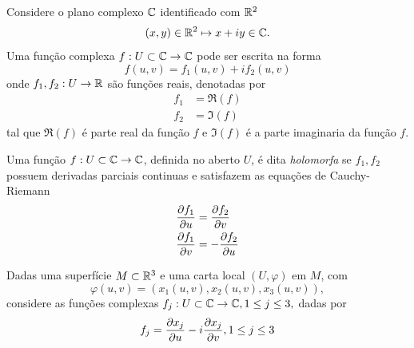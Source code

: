 Considere o plano complexo $\mathbb{C}$ identificado com $\mathbb{R}^2$
\begin{equation*}
(x,y) \in \mathbb{R}^2 \mapsto x + iy \in \mathbb{C}.
\end{equation*}
Uma função complexa $f: U \subset \mathbb{C} \rightarrow \mathbb{C}$ pode ser escrita na forma
\begin{equation*}
f(u,v) = f_1(u,v) + i f_2(u,v)
\end{equation*}
onde $f_1, f_2: U \rightarrow \mathbb{R}$ são funções reais, denotadas por
\begin{align*}
f_1 &= \Re(f)\\
f_2 &= \Im(f)
\end{align*}
tal que $\Re(f)$ é parte real da função $f$ e $\Im(f)$ é a parte imaginaria da função $f$.
\begin{definicao}
	Uma função $f: U \subset \mathbb{C} \rightarrow \mathbb{C}$, definida no aberto $U$, é dita \emph{holomorfa} se $f_1, f_2$ possuem derivadas parciais continuas e satisfazem as equações de Cauchy-Riemann
	\begin{align*}
	\frac{\partial f_1}{\partial u} &= \frac{\partial f_2}{\partial v}\\
	\frac{\partial f_1}{\partial v} &= - \frac{\partial f_2}{\partial u}
	\end{align*}
\end{definicao}



Dadas uma superfície $M \subset \mathbb{R}^3$ e uma carta local $(U, \varphi)$ em $M$, com
\begin{equation*}
\varphi(u,v) = (x_1(u,v), x_2(u,v), x_3(u,v)),
\end{equation*}
considere as funções complexas $f_j: U \subset \mathbb{C} \rightarrow \mathbb{C}, 1 \leq j \leq 3,$ dadas por
\begin{equation}\label{carta_isoterma_cauchy-riemann}
f_j = \frac{\partial x_j}{\partial u} - i \frac{\partial x_j}{\partial v}, 1 \leq j \leq 3
\end{equation}

